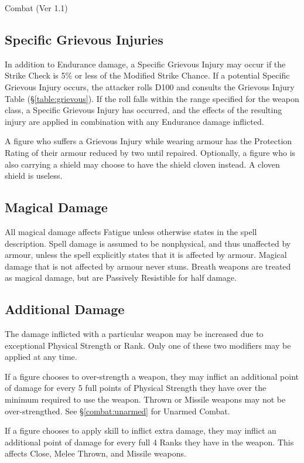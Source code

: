 \begin{Chapter}{Combat (Ver 1.1)}
\subsection{Specific Grievous Injuries}

In addition to Endurance damage, a Specific Grievous Injury may occur
if the Strike Check is 5\% or less of the Modified Strike Chance.  If
a potential Specific Grievous Injury occurs, the attacker rolls D100
and consults the Grievous Injury Table (\S\ref{table:grievous}).  If
the roll falls within the range specified for the weapon class, a
Specific Grievous Injury has occurred, and the effects of the
resulting injury are applied in combination with any Endurance damage
inflicted.

A figure who suffers a Grievous Injury while wearing armour has the
Protection Rating of their armour reduced by two until repaired.
Optionally, a figure who is also carrying a shield may choose to have
the shield cloven instead.  A cloven shield is useless.

\subsection{Magical Damage}

All magical damage affects Fatigue unless otherwise states in the
spell description. Spell damage is assumed to be nonphysical, and thus
unaffected by armour, unless the spell explicitly states that it is
affected by armour.  Magical damage that is not affected by armour
never stuns.  Breath weapons are treated as magical damage, but are
Passively Resistible for half damage.

\subsection{Additional Damage}

The damage inflicted with a particular weapon may be increased due to
exceptional Physical Strength or Rank.  Only one of these two
modifiers may be applied at any time.

If a figure chooses to over-strength a weapon, they may inflict an
additional point of damage for every 5 full points of Physical
Strength they have over the minimum required to use the weapon.
Thrown or Missile weapons may not be over-strengthed.  See
\S\ref{combat:unarmed} for Unarmed Combat.

If a figure chooses to apply skill to inflict extra damage, they may
inflict an additional point of damage for every full 4 Ranks they have
in the weapon.  This affects Close, Melee Thrown, and Missile weapons.


\end{Chapter}
